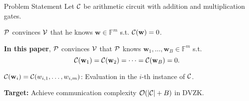 \begin{frame}{Problem Statement}
	Let $\mathcal{C}$ be arithmetic circuit with addition and multiplication gates.
	
	$\mathcal{P}$ convinces $\mathcal{V}$ that he knows $\mathbf{w} \in \mathbb{F}^m$ s.t. $\mathcal{C}(\mathbf{w}) = 0$.
	
	\textbf{In this paper}, $\mathcal{P}$ convinces $\mathcal{V}$ that $\mathcal{P}$ knows $\mathbf{w}_1, \dots, \mathbf{w}_B \in \mathbb{F}^m$ s.t.
	\begin{equation*}
		\mathcal{C}(\mathbf{w}_1) = \mathcal{C}(\mathbf{w}_2) = \dots = \mathcal{C}(\mathbf{w}_B) = 0.
	\end{equation*}

	$\mathcal{C}(\mathbf{w}_i) = \mathcal{C}(w_{i,1}, \dots, w_{i, m})$: Evaluation in the $i$-th instance of $\mathcal{C}$.
	
	\textbf{Target:} Achieve communication complexity $\mathcal{O}(|\mathcal{C}| + B)$ in DVZK.
\end{frame}